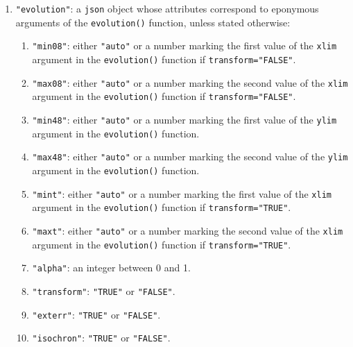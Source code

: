 \begin{refsection}
\begin{enumerate}[leftmargin=\parindent,align=left,
      labelwidth=\parindent,label*=2.\arabic*.]
\begin{enumerate}[leftmargin=\parindent,align=left,
      labelwidth=\parindent,label*=\arabic*.]
    \item{\tt "ellipsefill"}: a valid entry for the
      \texttt{ellipse.fill} argument of the \texttt{concordia()}
      function.
    \item{\tt "ellipsestroke"}: a valid entry for the
      \texttt{ellipse.stroke} argument of the \texttt{concordia()}
      function.
    \item{\tt "clabel"}: a text string.
    \item{\tt "ticks"}: either \texttt{"auto"} or a vector of numbers.
\end{enumerate}
\item{\tt "evolution"}: a \texttt{json} object whose attributes
  correspond to eponymous arguments of the \texttt{evolution()}
  function, unless stated otherwise:
  \begin{enumerate}[leftmargin=\parindent,align=left,
      labelwidth=\parindent,label*=\arabic*.]
  \item{\tt "min08"}: either \texttt{"auto"} or a number marking the
    first value of the \texttt{xlim} argument in the
    \texttt{evolution()} function if \texttt{transform="FALSE"}.
  \item{\tt "max08"}: either \texttt{"auto"} or a number marking the
    second value of the \texttt{xlim} argument in the
    \texttt{evolution()} function if \texttt{transform="FALSE"}.
  \item{\tt "min48"}: either \texttt{"auto"} or a number marking the
    first value of the \texttt{ylim} argument in the
    \texttt{evolution()} function.
  \item{\tt "max48"}: either \texttt{"auto"} or a number marking the
    second value of the \texttt{ylim} argument in the
    \texttt{evolution()} function.
  \item{\tt "mint"}: either \texttt{"auto"} or a number marking the
    first value of the \texttt{xlim} argument in the
    \texttt{evolution()} function if \texttt{transform="TRUE"}.
  \item{\tt "maxt"}: either \texttt{"auto"} or a number marking the
    second value of the \texttt{xlim} argument in the
    \texttt{evolution()} function if \texttt{transform="TRUE"}.
  \item{\tt "alpha"}: an integer between 0 and 1.
  \item{\tt "transform"}: \texttt{"TRUE"} or \texttt{"FALSE"}.
  \item{\tt "exterr"}: \texttt{"TRUE"} or \texttt{"FALSE"}.
  \item{\tt "isochron"}: \texttt{"TRUE"} or \texttt{"FALSE"}.

\end{enumerate}
\end{enumerate}
\end{refsection}
